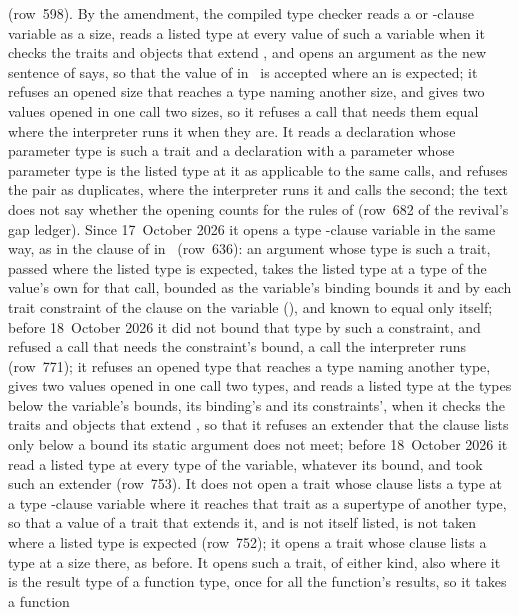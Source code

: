 \begin{description}
(row~598).
By the amendment, the compiled type checker reads a  or 
-clause variable as a size, reads a listed type at every value of
such a variable when it checks the traits and objects that extend , and
opens an argument as the new sentence of  says, so that the
value of  in \library\ is accepted where an
 is expected; it refuses an opened size that
reaches a type naming another size, and gives two values opened in one call
two sizes, so it refuses a call that needs them equal where the interpreter
runs it when they are.
It reads a declaration whose parameter type is such a trait and a declaration
with a  parameter whose parameter type is the listed type at it as
applicable to the same calls, and refuses the pair as duplicates, where the
interpreter runs it and calls the second; the text does not say whether the
opening counts for the rules of 
(row~682 of the revival's gap ledger).
Since 17~October 2026 it opens a type -clause variable in the same
way, as in the clause of  in \library\ (row~636): an argument whose
type is such a trait, passed where the listed type is expected, takes the listed
type at a type of the value's own for that call, bounded as the variable's
binding bounds it and by each trait constraint of the clause on the variable
(), and known to equal only itself; before 18~October 2026
it did not bound that type by such a constraint, and refused a call that needs
the constraint's bound, a call the interpreter runs (row~771); it refuses an
opened type that
reaches a type naming another type, gives two values opened in one call two
types, and reads a listed type at the types below the variable's bounds, its
binding's and its constraints', when it checks the traits and objects that
extend , so that it refuses an extender that the clause lists only below
a bound its static argument does not meet; before 18~October 2026 it read a
listed type at every type of the variable, whatever its bound, and took such an
extender (row~753).
It does not open a trait whose clause lists a type at a type
-clause variable where it reaches that trait as a supertype of
another type, so that a value of a trait that extends it, and is not itself
listed, is not taken where a listed type is expected (row~752); it opens a
trait whose clause lists a type at a size there, as before.
It opens such a trait, of either kind, also where it is the result type of a
function type, once for all the function's results, so it takes a function

\end{description}
